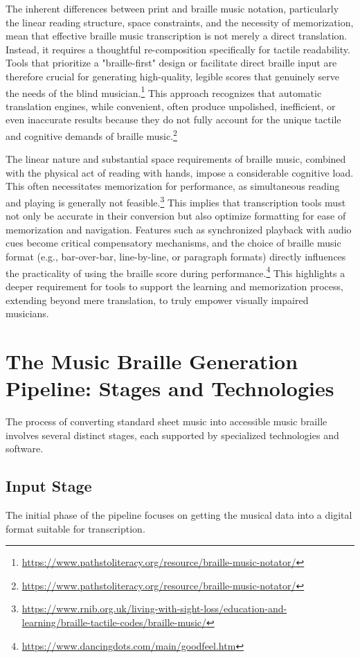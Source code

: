 The inherent differences between print and braille music notation, particularly the linear reading structure, space constraints, and the necessity of memorization, mean that effective braille music transcription is not merely a direct translation. Instead, it requires a thoughtful re-composition specifically for tactile readability. Tools that prioritize a "braille-first" design or facilitate direct braille input are therefore crucial for generating high-quality, legible scores that genuinely serve the needs of the blind musician.\footnote{\url{https://www.pathstoliteracy.org/resource/braille-music-notator/}} This approach recognizes that automatic translation engines, while convenient, often produce unpolished, inefficient, or even inaccurate results because they do not fully account for the unique tactile and cognitive demands of braille music.\footnote{\url{https://www.pathstoliteracy.org/resource/braille-music-notator/}}

The linear nature and substantial space requirements of braille music, combined with the physical act of reading with hands, impose a considerable cognitive load. This often necessitates memorization for performance, as simultaneous reading and playing is generally not feasible.\footnote{\url{https://www.rnib.org.uk/living-with-sight-loss/education-and-learning/braille-tactile-codes/braille-music/}} This implies that transcription tools must not only be accurate in their conversion but also optimize formatting for ease of memorization and navigation. Features such as synchronized playback with audio cues become critical compensatory mechanisms, and the choice of braille music format (e.g., bar-over-bar, line-by-line, or paragraph formats) directly influences the practicality of using the braille score during performance.\footnote{\url{https://www.dancingdots.com/main/goodfeel.htm}} This highlights a deeper requirement for tools to support the learning and memorization process, extending beyond mere translation, to truly empower visually impaired musicians.

\section{The Music Braille Generation Pipeline: Stages and Technologies}
The process of converting standard sheet music into accessible music braille involves several distinct stages, each supported by specialized technologies and software.

\subsection{Input Stage}
The initial phase of the pipeline focuses on getting the musical data into a digital format suitable for transcription.


